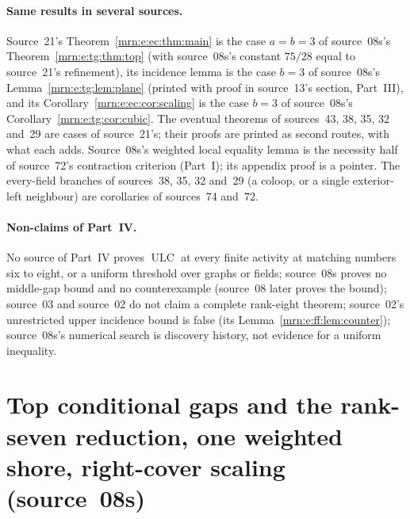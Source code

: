 \documentclass[11pt,a4paper]{article}
\theoremstyle{remark}\newtheorem{remark}[theorem]{Remark}
\newcommand{\ULC}{\operatorname{ULC}}      %
\begin{document}
\paragraph{Same results in several sources.}
Source~21's Theorem~\ref{mrn:e:ec:thm:main} is the case $a=b=3$ of source~08s's
Theorem~\ref{mrn:e:tg:thm:top} (with source~08s's constant $75/28$ equal to
source~21's refinement), its incidence lemma is the case $b=3$ of source~08s's
Lemma~\ref{mrn:e:tg:lem:plane} (printed with proof in source~13's section,
Part~III), and its Corollary~\ref{mrn:e:ec:cor:scaling} is the case $b=3$ of
source~08s's Corollary~\ref{mrn:e:tg:cor:cubic}. The eventual theorems of
sources~43, 38, 35, 32 and~29 are cases of source~21's; their proofs are
printed as second routes, with what each adds. Source~08s's weighted local
equality lemma is the necessity half of source~72's contraction criterion
(Part~I); its appendix proof is a pointer. The every-field branches of
sources~38, 35, 32 and~29 (a coloop, or a single exterior-left neighbour)
are corollaries of sources~74 and~72.

\paragraph{Non-claims of Part~IV.}
No source of Part~IV proves $\ULC$ at every finite activity at matching
numbers six to eight, or a uniform threshold over graphs or fields;
source~08s proves no middle-gap bound and no counterexample (source~08 later
proves the bound); source~03 and source~02 do not claim a complete
rank-eight theorem; source~02's unrestricted upper incidence bound is false
(its Lemma~\ref{mrn:e:ff:lem:counter}); source~08s's numerical search is
discovery history, not evidence for a uniform inequality.

\section{Top conditional gaps and the rank-seven reduction, one weighted shore, right-cover scaling (source~08s)}\label{mrn:src:08s}
\end{document}
